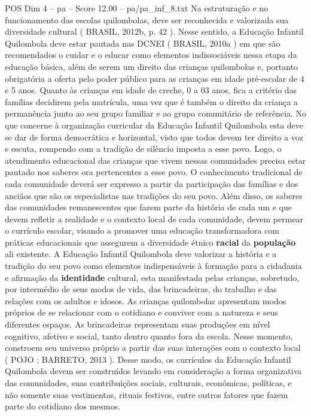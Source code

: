 \begin{textsample}{POS Dim 4 – pa – Score 12.00 – pa/pa\_inf\_8.txt}
Na estruturação e no funcionamento das escolas quilombolas, deve ser reconhecida e valorizada sua diversidade cultural ( BRASIL, 2012b, p. 42 ).
Nesse sentido, a Educação Infantil Quilombola deve estar pautada nas DCNEI ( BRASIL, 2010a ) em que são recomendados o cuidar e o educar como elementos indissociáveis nessa etapa da educação básica, além de serem um direito das crianças quilombolas e, portanto obrigatória a oferta pelo poder público para as crianças em idade pré-escolar de 4 e 5 anos.
Quanto às crianças em idade de creche, 0 a 03 anos, fica a critério das famílias decidirem pela matrícula, uma vez que é também o direito da criança a permanência junto ao seu grupo familiar e ao grupo comunitário de referência.
No que concerne à organização curricular da Educação Infantil Quilombola esta deve se dar de forma democrática e horizontal, visto que todos devem ter direito a voz e escuta, rompendo com a tradição de silêncio imposta a esse povo.
Logo, o atendimento educacional das crianças que vivem nessas comunidades precisa estar pautado nos saberes ora pertencentes a esse povo.
O conhecimento tradicional de cada comunidade deverá ser expresso a partir da participação das famílias e dos anciãos que são os especialistas nas tradições do seu povo.
Além disso, os saberes das comunidades remanescentes que fazem parte da história de cada um e que devem refletir a realidade e o contexto local de cada comunidade, devem permear o currículo escolar, visando a promover uma educação transformadora com práticas educacionais que assegurem a diversidade étnico \textbf{racial} da \textbf{população} ali existente.
A Educação Infantil Quilombola deve valorizar a história e a tradição do seu povo como elementos indispensáveis à formação para a cidadania e afirmação da \textbf{identidade} cultural, esta manifestada pelas crianças, sobretudo, por intermédio de seus modos de vida, das brincadeiras, do trabalho e das relações com os adultos e idosos.
As crianças quilombolas apresentam modos próprios de se relacionar com o cotidiano e conviver com a natureza e seus diferentes espaços.
As brincadeiras representam suas produções em nível cognitivo, afetivo e social, tanto dentro quanto fora da escola.
Nesse momento, constroem seu universo próprio a partir das suas interações com o contexto local ( POJO ; BARRETO, 2013 ).
Desse modo, os currículos da Educação Infantil Quilombola devem ser construídos levando em consideração a forma organizativa das comunidades, suas contribuições sociais, culturais, econômicas, políticas, e não somente suas vestimentas, rituais festivos, entre outros fatores que fazem parte do cotidiano dos mesmos.

\end{textsample}
